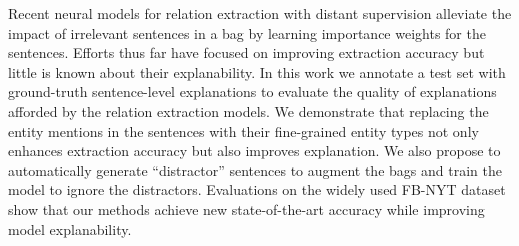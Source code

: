 Recent neural models for relation extraction with distant supervision alleviate the impact of irrelevant sentences in a bag by learning importance weights for the sentences. Efforts thus far have focused on improving extraction accuracy but little is known about their explanability. In this work we annotate a test set with ground-truth sentence-level explanations to evaluate the quality of explanations afforded by the relation extraction models. We demonstrate that replacing the entity mentions in the sentences with their fine-grained entity types not only enhances extraction accuracy but also improves explanation. We also propose to automatically generate ``distractor'' sentences to augment the bags and train the model to ignore the distractors. Evaluations on the widely used FB-NYT dataset show that our methods achieve new state-of-the-art accuracy while improving model explanability.
